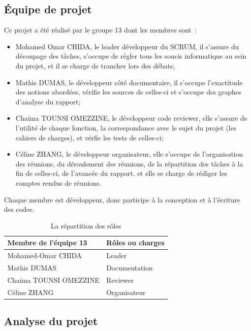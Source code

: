 \documentclass[12pt]{article}
\begin{document}
\subsection{Équipe de projet}
Ce projet a été réalisé par le groupe 13 dont les membres sont~:
\begin{itemize}
    \item Mohamed Omar CHIDA, le leader développeur du SCRUM, il s'assure du découpage des tâches, s'occupe de régler tous les soucis informatique au sein du projet, et il se charge de trancher lors des débats;
    \item Mathis DUMAS, le développeur côté documentaire, il s'occupe l'exactitude des notions abordées, vérifie les sources de celles-ci et s'occupe des graphes d'analyse du rapport;
    \item Chaima TOUNSI OMEZZINE, le développeur code reviewer, elle s'assure de l'utilité de chaque fonction, la correspondance avec le sujet du projet (les cahiers de charges), et vérfie les tests de celles-ci;
    \item Céline ZHANG, le développeur organisateur, elle s'occupe de l'organisation des réunions, du déroulement des réunions, de la répartition des tâches à la fin de celles-ci, de l'avancée du rapport, et elle se charge de rédiger les comptes rendus de réunions.
\end{itemize}
Chaque membre est développeur, donc participe à la conception et à l'écriture des codes.%
\begin{table}[!h]
\begin{center}
    \begin{tabular}{|l|l|}
    \hline
        Membre de l'équipe 13 & Rôles ou charges \\
    \hline
    \hline
        Mohamed-Omar CHIDA & Leader \\
    \hline
        Mathis DUMAS & Documentation \\
    \hline
        Chaima TOUNSI OMEZZINE & Reviewer \\
    \hline
        Céline ZHANG & Organisateur \\
    \hline
    \end{tabular}
\end{center}
\caption{La répartition des rôles}
\label{tab:roles}
\end{table}

\subsection{Analyse du projet}
\end{document}

